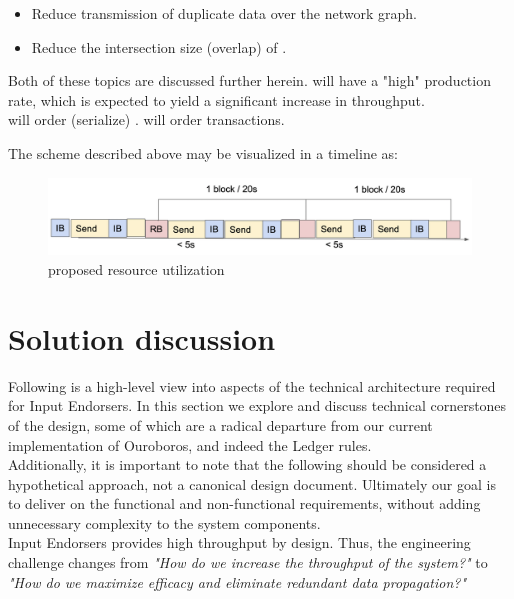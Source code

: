 \documentclass[11pt,a4paper]{article}
\begin{document}
\begin{itemize}
  \item Reduce transmission of duplicate data over the network graph.
  \item Reduce the intersection size (overlap) of .
\end{itemize}

Both of these topics are discussed further herein.  will have a "high" production rate, which is expected to
yield a significant increase in throughput. \\


 will order (serialize) .
 will order transactions.

The scheme described above may be visualized in a timeline as:

\begin{figure}[ht]
  \includegraphics[width=\linewidth]{proposed_usage.png}
  \caption{proposed resource utilization}
  \label{fig:proposed utilization}
\end{figure}

\pagebreak

\section{Solution discussion}
Following is a high-level view into aspects of the technical architecture required for Input Endorsers.
In this section we explore and discuss technical cornerstones of the design, some of which are a radical
departure from our current implementation of Ouroboros, and indeed the Ledger rules. \\ 

Additionally, it is important to note that the following should be considered a hypothetical approach, 
not a canonical design document. Ultimately our goal is to deliver on the functional and non-functional 
requirements, without adding unnecessary complexity to the system components. \\

Input Endorsers provides high throughput by design. Thus, the engineering challenge changes from \emph{"How do we
increase the throughput of the system?"} to \emph{"How do we maximize efficacy and eliminate redundant data propagation?"} \\
\end{document}
